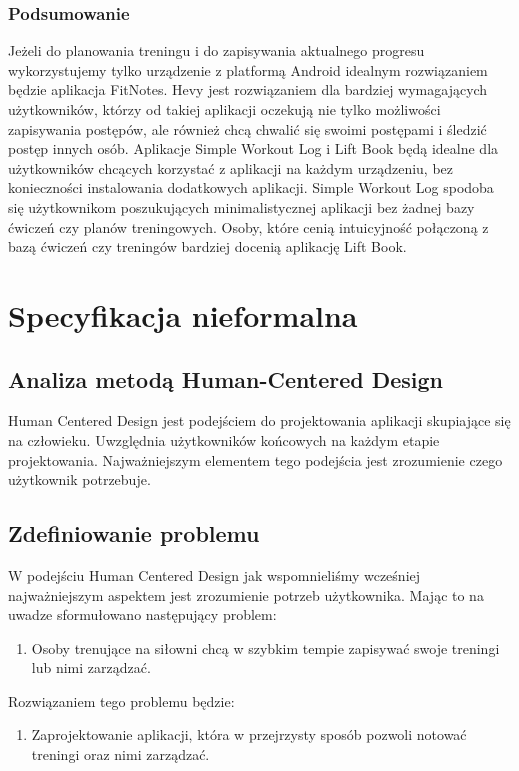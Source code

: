 \documentclass{article}
\begin{document}
            \subsubsection*{Podsumowanie}
                  Jeżeli do planowania treningu i do zapisywania aktualnego progresu wykorzystujemy tylko urządzenie z platformą Android idealnym rozwiązaniem będzie aplikacja FitNotes. Hevy jest rozwiązaniem dla bardziej wymagających użytkowników, którzy od takiej aplikacji oczekują nie tylko możliwości zapisywania postępów, ale również chcą chwalić się swoimi postępami i śledzić postęp innych osób. Aplikacje Simple Workout Log i Lift Book będą idealne dla użytkowników chcących korzystać z aplikacji na każdym urządzeniu, bez konieczności instalowania dodatkowych aplikacji. Simple Workout Log spodoba się użytkownikom poszukujących minimalistycznej aplikacji bez żadnej bazy ćwiczeń czy planów treningowych. Osoby, które cenią intuicyjność połączoną z bazą ćwiczeń czy treningów bardziej docenią aplikację Lift Book.

\section{Specyfikacja nieformalna}
      \subsection{Analiza metodą Human-Centered Design}
            Human Centered Design jest podejściem do projektowania aplikacji skupiające się na człowieku. Uwzględnia użytkowników końcowych na każdym etapie projektowania. Najważniejszym elementem tego podejścia jest zrozumienie czego użytkownik potrzebuje.
      \subsection{Zdefiniowanie problemu}
            W podejściu Human Centered Design jak wspomnieliśmy wcześniej najważniejszym aspektem jest zrozumienie potrzeb użytkownika. Mając to na uwadze sformułowano następujący problem:
            \begin{enumerate}
                  \item Osoby trenujące na siłowni chcą w szybkim tempie zapisywać swoje treningi lub nimi zarządzać.
            \end{enumerate}
            Rozwiązaniem tego problemu będzie:
            \begin{enumerate}
                  \item Zaprojektowanie aplikacji, która w przejrzysty sposób pozwoli notować treningi oraz nimi zarządzać.
            \end{enumerate}
\end{document}

